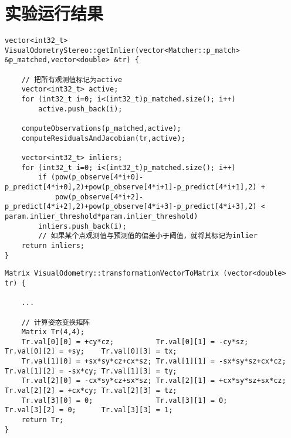 \documentclass[UTF8]{ctexart}
\begin{document}
    \section{实验运行结果}
    \begin{verbatim}
vector<int32_t> VisualOdometryStereo::getInlier(vector<Matcher::p_match> &p_matched,vector<double> &tr) {

    // 把所有观测值标记为active
    vector<int32_t> active;
    for (int32_t i=0; i<(int32_t)p_matched.size(); i++)
        active.push_back(i);

    computeObservations(p_matched,active);
    computeResidualsAndJacobian(tr,active);

    vector<int32_t> inliers;
    for (int32_t i=0; i<(int32_t)p_matched.size(); i++)
        if (pow(p_observe[4*i+0]-p_predict[4*i+0],2)+pow(p_observe[4*i+1]-p_predict[4*i+1],2) +
            pow(p_observe[4*i+2]-p_predict[4*i+2],2)+pow(p_observe[4*i+3]-p_predict[4*i+3],2) < param.inlier_threshold*param.inlier_threshold)
        inliers.push_back(i);
        // 如果某个点观测值与预测值的偏差小于阈值，就将其标记为inlier
    return inliers;
}
    \end{verbatim}
    \begin{verbatim}
Matrix VisualOdometry::transformationVectorToMatrix (vector<double> tr) {

    ...

    // 计算姿态变换矩阵
    Matrix Tr(4,4);
    Tr.val[0][0] = +cy*cz;          Tr.val[0][1] = -cy*sz;          Tr.val[0][2] = +sy;    Tr.val[0][3] = tx;
    Tr.val[1][0] = +sx*sy*cz+cx*sz; Tr.val[1][1] = -sx*sy*sz+cx*cz; Tr.val[1][2] = -sx*cy; Tr.val[1][3] = ty;
    Tr.val[2][0] = -cx*sy*cz+sx*sz; Tr.val[2][1] = +cx*sy*sz+sx*cz; Tr.val[2][2] = +cx*cy; Tr.val[2][3] = tz;
    Tr.val[3][0] = 0;               Tr.val[3][1] = 0;               Tr.val[3][2] = 0;      Tr.val[3][3] = 1;
    return Tr;
}
    \end{verbatim}
\end{document}
